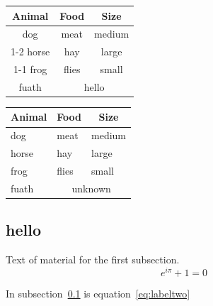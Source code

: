 \documentclass[a4paper,12pt,twocolumn]{article}
\begin{document}
\begin{tabular}{*{3}{c}}
	\toprule
	Animal & Food                      & Size   \\
	\midrule
	dog    & meat                      & medium \\
	\cmidrule{1-2}
	horse  & hay                       & large  \\
	\cmidrule(rl){1-1}
	\cmidrule{3-3}
	frog   & flies                     & small  \\
	fuath  & \multicolumn{2}{c}{hello}          \\
	\bottomrule
\end{tabular}

\begin{tabular}{lll}
	\toprule
	\multicolumn{1}{c}{Animal} & \multicolumn{1}{c}{Food}    & \multicolumn{1}{c}{Size} \\
	\midrule
	dog                        & meat                        & medium                   \\
	horse                      & hay                         & large                    \\
	frog                       & flies                       & small                    \\
	fuath                      & \multicolumn{2}{c}{unknown}                            \\
	\bottomrule
\end{tabular}

\subsection{hello}
\label{subsec:labelone}

Text of material for the first subsection.
\begin{equation}
	e^{i\pi}+1 = 0
	\label{eq:labeltwo}
\end{equation}

In subsection~\ref{subsec:labelone} is equation~\ref{eq:labeltwo}
\lipsum[1]
\end{document}
